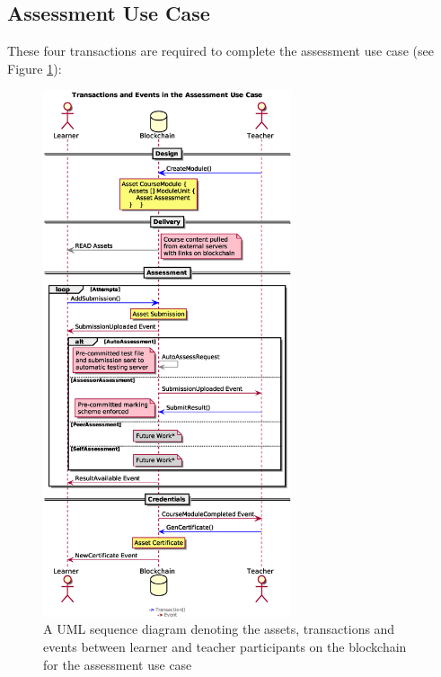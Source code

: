\subsection{Assessment Use Case}

These four transactions are required to complete the assessment use case (see Figure \ref{fig:assessmentloop}):

\begin{figure}[!ht]
	\centering
	\includegraphics[width=0.65\textwidth]{assessmentloop}
	\caption[Assessment Use Case]
	{A UML sequence diagram denoting the assets, transactions and events between
		learner and teacher participants on the blockchain for the assessment use case}
	\label{fig:assessmentloop}
\end{figure}

